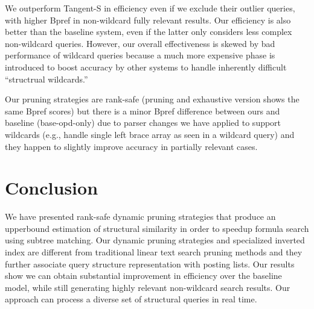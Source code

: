 \documentclass[runningheads]{llncs}
\begin{document}
We outperform Tangent-S in efficiency even if we exclude their outlier queries, with higher Bpref in non-wildcard fully relevant results. Our efficiency is also better than the baseline system, even if the latter only considers less complex non-wildcard queries.
%
However, our overall effectiveness is skewed by bad performance of wildcard queries because a much more expensive phase is introduced to boost accuracy by other systems to handle inherently difficult ``structrual wildcards.''

Our pruning strategies are rank-safe (pruning and exhaustive version shows the same Bpref scores) but there is a minor Bpref difference between ours and baseline (base-opd-only) due to parser changes we have applied to support wildcards (e.g., handle single left brace array as seen in a wildcard query) and they happen to slightly improve accuracy in partially relevant cases.


\section{Conclusion}
We have presented rank-safe dynamic pruning strategies that produce an upperbound estimation of structural similarity in order to speedup formula search using subtree matching.
Our dynamic pruning strategies and specialized inverted index are different from traditional linear text search pruning methods and they further associate query structure representation with posting lists.
Our results show we can obtain substantial improvement in efficiency over the baseline model, while still generating highly relevant non-wildcard search results.
Our approach can process a diverse set of structural queries in real time.


\end{document}

